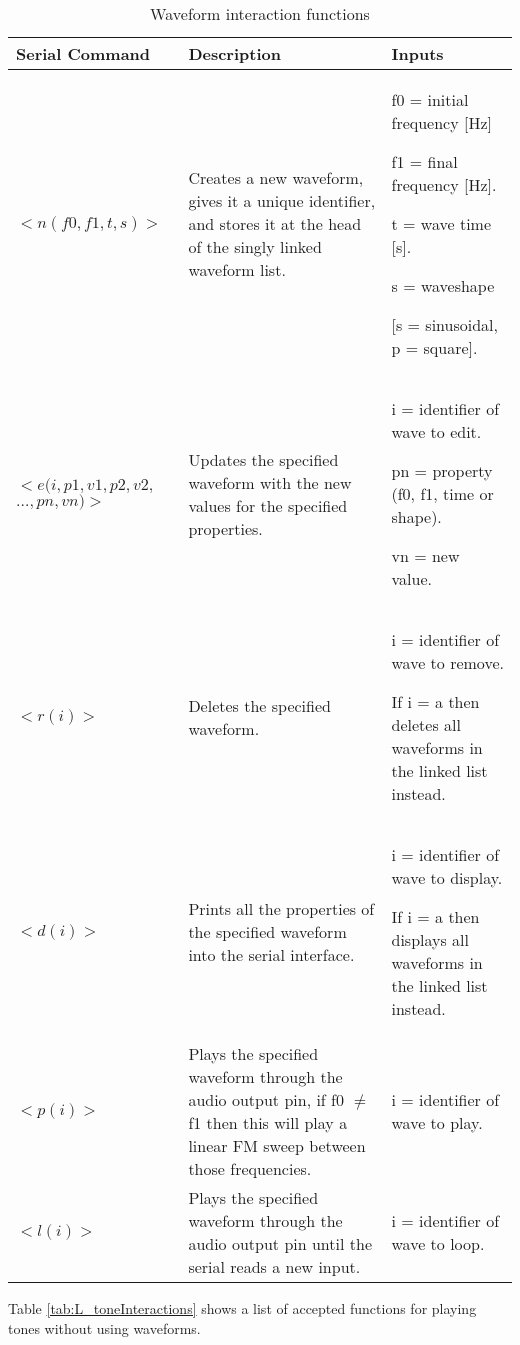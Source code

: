 \begin{table} [!htb]
	\caption{Waveform interaction functions}
	\label{tab:L_waveformInteractions}
	\centering
	\begin{tabular}{ |m{}|m{}|m{}| } 
		\hline
		Serial Command & Description & Inputs \\ 
		\hline
		\hline
		\centering $<n(f0,f1,t,s)>$ & Creates a new waveform, gives it a unique identifier, and stores it at the head of the singly linked waveform list. & f0 = initial frequency [Hz]
		
		f1 = final frequency [Hz].
		
		t = wave time [s].
		
		s = waveshape 
		
		[s = sinusoidal, p = square]. \\
		
		\hline
		\centering$<e(i,p1,v1,p2,v2,$
		\centering$…,pn,vn)>$ & Updates the specified waveform with the new values for the specified properties. & i = identifier of wave to edit.
		
		pn = property (f0, f1, time or shape).
		
		vn = new value. \\
		
		\hline
		\centering$<r(i)>$ & Deletes the specified waveform. & i = identifier of wave to remove.
		
		If i = a then deletes all waveforms in the linked list instead. \\
		\hline
		\centering$<d(i)>$ & Prints all the properties of the specified waveform into the serial interface. & i = identifier of wave to display.
		
		If i = a then displays all waveforms in the linked list instead.\\
		\hline
		\centering$<p(i)>$ & Plays the specified waveform through the audio output pin, 
		if f0 $\neq$ f1 then this will play a linear FM sweep between those frequencies. & i = identifier of wave to play. \\
		
		\hline
		\centering$<l(i)>$ & Plays the specified waveform through the audio output pin until the serial reads a new input. & i = identifier of wave to loop. \\
		\hline		
	\end{tabular}
\end{table}
\pagebreak

Table \ref{tab:L_toneInteractions} shows a list of accepted functions for playing tones without using waveforms. \\

